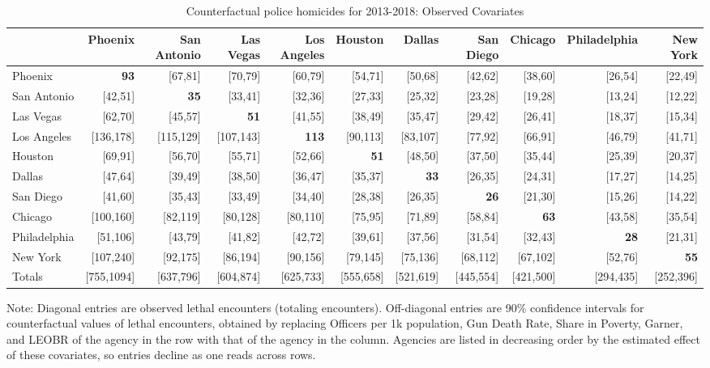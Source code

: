 \begin{table}[h!]\centering\scriptsize\tabcolsep=0.1cm\caption{Counterfactual police homicides for 2013-2018: Observed Covariates} \label{table:bootstrap_counterfactual_obs}\begin{tabular}{lrrrrrrrrrr}\hline \hline&Phoenix&San Antonio&Las Vegas&Los Angeles&Houston&Dallas&San Diego&Chicago&Philadelphia&New York\\
\hline
Phoenix&\textbf{93}&[67,81]&[70,79]&[60,79]&[54,71]&[50,68]&[42,62]&[38,60]&[26,54]&[22,49]\\
San Antonio&[42,51]&\textbf{35}&[33,41]&[32,36]&[27,33]&[25,32]&[23,28]&[19,28]&[13,24]&[12,22]\\
Las Vegas&[62,70]&[45,57]&\textbf{51}&[41,55]&[38,49]&[35,47]&[29,42]&[26,41]&[18,37]&[15,34]\\
Los Angeles&[136,178]&[115,129]&[107,143]&\textbf{113}&[90,113]&[83,107]&[77,92]&[66,91]&[46,79]&[41,71]\\
Houston&[69,91]&[56,70]&[55,71]&[52,66]&\textbf{51}&[48,50]&[37,50]&[35,44]&[25,39]&[20,37]\\
Dallas&[47,64]&[39,49]&[38,50]&[36,47]&[35,37]&\textbf{33}&[26,35]&[24,31]&[17,27]&[14,25]\\
San Diego&[41,60]&[35,43]&[33,49]&[34,40]&[28,38]&[26,35]&\textbf{26}&[21,30]&[15,26]&[14,22]\\
Chicago&[100,160]&[82,119]&[80,128]&[80,110]&[75,95]&[71,89]&[58,84]&\textbf{63}&[43,58]&[35,54]\\
Philadelphia&[51,106]&[43,79]&[41,82]&[42,72]&[39,61]&[37,56]&[31,54]&[32,43]&\textbf{28}&[21,31]\\
New York&[107,240]&[92,175]&[86,194]&[90,156]&[79,145]&[75,136]&[68,112]&[67,102]&[52,76]&\textbf{55}\\
\hline
Totals&[755,1094]&[637,796]&[604,874]&[625,733]&[555,658]&[521,619]&[445,554]&[421,500]&[294,435]&[252,396]\\
\hline 
 \end{tabular} 
 \begin{center} 
 \begin{minipage}{1.05\textwidth} %
 {\footnotesize Note: Diagonal entries are observed lethal encounters (totaling \totalincidentsten{} encounters). Off-diagonal entries are 90\% confidence intervals for counterfactual values of lethal encounters, obtained by replacing Officers per 1k population, Gun Death Rate, Share in Poverty, Garner, and LEOBR of the agency in the row with that of the agency in the column. Agencies are listed in decreasing order by the estimated effect of these covariates, so entries decline as one reads across rows.} 
 \end{minipage} 
 \end{center} 
 \end{table}